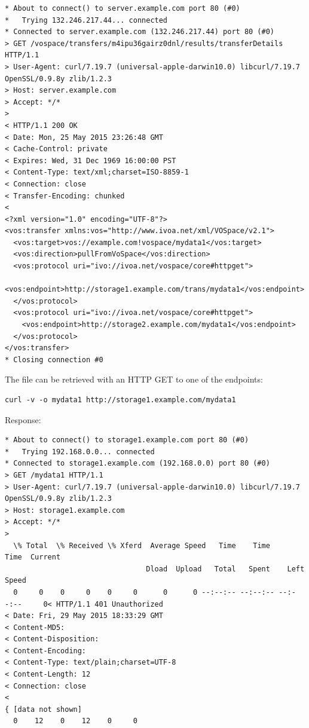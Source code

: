 \documentclass[11pt,a4paper]{ivoa}
\begin{document}
\begin{lstlisting}
* About to connect() to server.example.com port 80 (#0)
*   Trying 132.246.217.44... connected
* Connected to server.example.com (132.246.217.44) port 80 (#0)
> GET /vospace/transfers/m4ipu36gairz0dnl/results/transferDetails HTTP/1.1
> User-Agent: curl/7.19.7 (universal-apple-darwin10.0) libcurl/7.19.7 OpenSSL/0.9.8y zlib/1.2.3
> Host: server.example.com
> Accept: */*
>
< HTTP/1.1 200 OK
< Date: Mon, 25 May 2015 23:26:48 GMT
< Cache-Control: private
< Expires: Wed, 31 Dec 1969 16:00:00 PST
< Content-Type: text/xml;charset=ISO-8859-1
< Connection: close
< Transfer-Encoding: chunked
<
<?xml version="1.0" encoding="UTF-8"?>
<vos:transfer xmlns:vos="http://www.ivoa.net/xml/VOSpace/v2.1">
  <vos:target>vos://example.com!vospace/mydata1</vos:target>
  <vos:direction>pullFromVoSpace</vos:direction>
  <vos:protocol uri="ivo://ivoa.net/vospace/core#httpget">
    <vos:endpoint>http://storage1.example.com/trans/mydata1</vos:endpoint>
  </vos:protocol>
  <vos:protocol uri="ivo://ivoa.net/vospace/core#httpget">
    <vos:endpoint>http://storage2.example.com/mydata1</vos:endpoint>
  </vos:protocol>
</vos:transfer>
* Closing connection #0
\end{lstlisting}
The file can be retrieved with an HTTP GET to one of the endpoints:
\begin{lstlisting}
curl -v -o mydata1 http://storage1.example.com/mydata1
\end{lstlisting}
Response:
\begin{lstlisting}
* About to connect() to storage1.example.com port 80 (#0)
*   Trying 192.168.0.0... connected
* Connected to storage1.example.com (192.168.0.0) port 80 (#0)
> GET /mydata1 HTTP/1.1
> User-Agent: curl/7.19.7 (universal-apple-darwin10.0) libcurl/7.19.7 OpenSSL/0.9.8y zlib/1.2.3
> Host: storage1.example.com
> Accept: */*
>
  \% Total  \% Received \% Xferd  Average Speed   Time    Time     Time  Current
                                 Dload  Upload   Total   Spent    Left  Speed
  0     0    0     0    0     0      0      0 --:--:-- --:--:-- --:--:--     0< HTTP/1.1 401 Unauthorized
< Date: Fri, 29 May 2015 18:33:29 GMT
< Content-MD5:
< Content-Disposition:
< Content-Encoding:
< Content-Type: text/plain;charset=UTF-8
< Content-Length: 12
< Connection: close
<
{ [data not shown]
  0    12    0    12    0     0   
\end{lstlisting}
\end{document}
